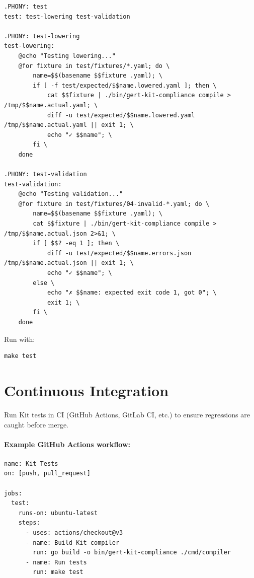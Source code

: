 \begin{verbatim}
.PHONY: test
test: test-lowering test-validation

.PHONY: test-lowering
test-lowering:
	@echo "Testing lowering..."
	@for fixture in test/fixtures/*.yaml; do \
		name=$$(basename $$fixture .yaml); \
		if [ -f test/expected/$$name.lowered.yaml ]; then \
			cat $$fixture | ./bin/gert-kit-compliance compile > /tmp/$$name.actual.yaml; \
			diff -u test/expected/$$name.lowered.yaml /tmp/$$name.actual.yaml || exit 1; \
			echo "✓ $$name"; \
		fi \
	done

.PHONY: test-validation
test-validation:
	@echo "Testing validation..."
	@for fixture in test/fixtures/04-invalid-*.yaml; do \
		name=$$(basename $$fixture .yaml); \
		cat $$fixture | ./bin/gert-kit-compliance compile > /tmp/$$name.actual.json 2>&1; \
		if [ $$? -eq 1 ]; then \
			diff -u test/expected/$$name.errors.json /tmp/$$name.actual.json || exit 1; \
			echo "✓ $$name"; \
		else \
			echo "✗ $$name: expected exit code 1, got 0"; \
			exit 1; \
		fi \
	done
\end{verbatim}

Run with:

\begin{verbatim}
make test
\end{verbatim}

\section{Continuous Integration}
\label{sec:ci}

Run Kit tests in CI (GitHub Actions, GitLab CI, etc.) to ensure regressions are
caught before merge.

\paragraph{Example GitHub Actions workflow:}

\begin{verbatim}
name: Kit Tests
on: [push, pull_request]

jobs:
  test:
    runs-on: ubuntu-latest
    steps:
      - uses: actions/checkout@v3
      - name: Build Kit compiler
        run: go build -o bin/gert-kit-compliance ./cmd/compiler
      - name: Run tests
        run: make test
\end{verbatim}

